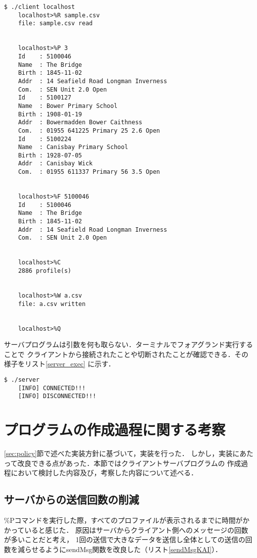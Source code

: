 \documentclass[11pt]{jarticle}
\begin{document}
\begin{lstlisting}[caption=クライアントプログラム実行例,label=client_exec]
    $ ./client localhost
    localhost>%R sample.csv
    file: sample.csv read


    localhost>%P 3
    Id    : 5100046
    Name  : The Bridge
    Birth : 1845-11-02
    Addr  : 14 Seafield Road Longman Inverness
    Com.  : SEN Unit 2.0 Open
    Id    : 5100127
    Name  : Bower Primary School
    Birth : 1908-01-19
    Addr  : Bowermadden Bower Caithness
    Com.  : 01955 641225 Primary 25 2.6 Open
    Id    : 5100224
    Name  : Canisbay Primary School
    Birth : 1928-07-05
    Addr  : Canisbay Wick
    Com.  : 01955 611337 Primary 56 3.5 Open


    localhost>%F 5100046
    Id    : 5100046
    Name  : The Bridge
    Birth : 1845-11-02
    Addr  : 14 Seafield Road Longman Inverness
    Com.  : SEN Unit 2.0 Open


    localhost>%C
    2886 profile(s)


    localhost>%W a.csv
    file: a.csv written


    localhost>%Q
\end{lstlisting}

サーバプログラムは引数を何も取らない．ターミナルでフォアグランド実行することで
クライアントから接続されたことや切断されたことが確認できる．その様子をリスト\ref{server_exec}
に示す．

\begin{lstlisting}[caption=サーバプログラムの実行例,label=server_exec]
    $ ./server 
    [INFO] CONNECTED!!!
    [INFO] DISCONNECTED!!!
\end{lstlisting}


\section{プログラムの作成過程に関する考察}

\ref{sec:policy}節で述べた実装方針に基づいて，実装を行った．
しかし，実装にあたって改良できる点があった．本節ではクライアントサーバプログラムの
作成過程において検討した内容及び，考察した内容について述べる．

\subsection{サーバからの送信回数の削減}

\%Pコマンドを実行した際，すべてのプロファイルが表示されるまでに時間がかかっていると感じた．
原因はサーバからクライアント側へのメッセージの回数が多いことだと考え，
1回の送信で大きなデータを送信し全体としての送信の回数を減らせるようにsendMsg関数を改良した（リスト\ref{sendMsgKAI}）．
\end{document}
